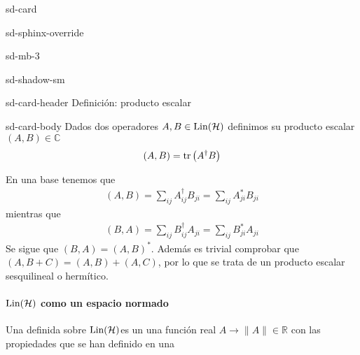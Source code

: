 \documentclass[letterpaper,10pt,english]{jupyterBook}
\newcommand{\Hil}{{\cal H}}
\newcommand{\Lin}{\hbox{Lin}}
\begin{document}
\sphinxAtStartPar


\begin{sphinxuseclass}{sd-card}
\begin{sphinxuseclass}{sd-sphinx-override}
\begin{sphinxuseclass}{sd-mb-3}
\begin{sphinxuseclass}{sd-shadow-sm}
\begin{sphinxuseclass}{sd-card-header}
\sphinxAtStartPar
Definición: producto escalar

\end{sphinxuseclass}
\begin{sphinxuseclass}{sd-card-body}
\sphinxAtStartPar
Dados dos operadores \(A, B \in \Lin(\Hil)\)  definimos su  producto escalar   \(( A, B)\in {\mathbb C}\)
\begin{equation*}
\begin{split}
( A, B)= {\rm tr}\left( A^\dagger B \right) 
\end{split}
\end{equation*}
\end{sphinxuseclass}
\end{sphinxuseclass}
\end{sphinxuseclass}
\end{sphinxuseclass}
\end{sphinxuseclass}
\sphinxAtStartPar
En una base tenemos que
\begin{equation*}
\begin{split}
(A,B) = \sum_{ij} A^\dagger_{ij} B_{ji} = \sum_{ij} A^*_{ji} B_{ji}
\end{split}
\end{equation*}
\sphinxAtStartPar
mientras que
\begin{equation*}
\begin{split}
(B,A) = \sum_{ij} B^\dagger_{ij} A_{ji} = \sum_{ij} B^*_{ji} A_{ji}
\end{split}
\end{equation*}
\sphinxAtStartPar
Se sigue que  \((B,A) = (A,B)^*\). Además es trivial comprobar que  \((A,B+C) = (A,B) + (A,C)\), por lo que se trata de un producto escalar sesquilineal o hermítico.

\sphinxAtStartPar



\paragraph{\protect\(\Lin(\Hil)\protect\) como un espacio normado}
\label{\detokenize{docs/Part_01_Formalismo/Chapter_01_02_Formalismo_matem_xe1tico/01_03_Operadores_myst:lin-hil-como-un-espacio-normado}}
\sphinxAtStartPar
Una  definida sobre \(\Lin(\Hil)  \)es un una función real \( A\to  \| A\| \in {\mathbb R}\) con las propiedades
que se han definido en una 
\end{document}
